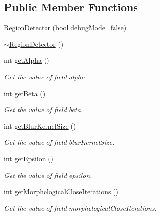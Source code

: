 \subsection*{\-Public \-Member \-Functions}
\begin{DoxyCompactItemize}
\item 
\hyperlink{classmultiscale_1_1analysis_1_1RegionDetector_aa6e891d8940358fe71e9a7e23f84452f}{\-Region\-Detector} (bool \hyperlink{classmultiscale_1_1analysis_1_1Detector_a4b42f796957efd6ee0b8cf7645494a65}{debug\-Mode}=false)
\item 
\hyperlink{classmultiscale_1_1analysis_1_1RegionDetector_a8e41bcae0698a746fee06e8fb9a63bd1}{$\sim$\-Region\-Detector} ()
\item 
int \hyperlink{classmultiscale_1_1analysis_1_1RegionDetector_a0cc3c3bfcd5e29b19a30acd0566a9d71}{get\-Alpha} ()
\begin{DoxyCompactList}\small\item\em \-Get the value of field alpha. \end{DoxyCompactList}\item 
int \hyperlink{classmultiscale_1_1analysis_1_1RegionDetector_a1b60390d9e55980ecf1da3616782a7e3}{get\-Beta} ()
\begin{DoxyCompactList}\small\item\em \-Get the value of field beta. \end{DoxyCompactList}\item 
int \hyperlink{classmultiscale_1_1analysis_1_1RegionDetector_af0b30b57a664d7a5b1bb0ec6be5e8068}{get\-Blur\-Kernel\-Size} ()
\begin{DoxyCompactList}\small\item\em \-Get the value of field blur\-Kernel\-Size. \end{DoxyCompactList}\item 
int \hyperlink{classmultiscale_1_1analysis_1_1RegionDetector_a730df92f22ef336a5e24ffdb9afa50c9}{get\-Epsilon} ()
\begin{DoxyCompactList}\small\item\em \-Get the value of field epsilon. \end{DoxyCompactList}\item 
int \hyperlink{classmultiscale_1_1analysis_1_1RegionDetector_a6099482d13eaf15e3c199155ba0a8816}{get\-Morphological\-Close\-Iterations} ()
\begin{DoxyCompactList}\small\item\em \-Get the value of field morphological\-Close\-Iterations. \end{DoxyCompactList}\item 

\end{DoxyCompactItemize}
